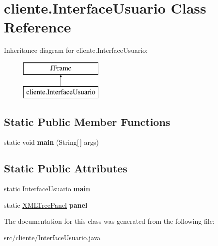 \hypertarget{classcliente_1_1_interface_usuario}{\section{cliente.\+Interface\+Usuario Class Reference}
\label{classcliente_1_1_interface_usuario}
}
Inheritance diagram for cliente.\+Interface\+Usuario\+:\begin{figure}[H]
\begin{center}
\leavevmode
\includegraphics[height=2.000000cm]{classcliente_1_1_interface_usuario}
\end{center}
\end{figure}
\subsection*{Static Public Member Functions}
\begin{DoxyCompactItemize}
\item 
\hypertarget{classcliente_1_1_interface_usuario_a0bca7dbd254234fe3e611c10620a3b3e}{static void {\bfseries main} (String\mbox{[}$\,$\mbox{]} args)}\label{classcliente_1_1_interface_usuario_a0bca7dbd254234fe3e611c10620a3b3e}

\end{DoxyCompactItemize}
\subsection*{Static Public Attributes}
\begin{DoxyCompactItemize}
\item 
\hypertarget{classcliente_1_1_interface_usuario_ab1d1c90168b592e095f5863fd06df3ba}{static \hyperlink{classcliente_1_1_interface_usuario}{Interface\+Usuario} {\bfseries main}}\label{classcliente_1_1_interface_usuario_ab1d1c90168b592e095f5863fd06df3ba}

\item 
\hypertarget{classcliente_1_1_interface_usuario_a0eafac58bc9b15d9e0ba7f5e388f92f8}{static \hyperlink{classjtree_1_1_x_m_l_tree_panel}{X\+M\+L\+Tree\+Panel} {\bfseries panel}}\label{classcliente_1_1_interface_usuario_a0eafac58bc9b15d9e0ba7f5e388f92f8}

\end{DoxyCompactItemize}


The documentation for this class was generated from the following file\+:\begin{DoxyCompactItemize}
\item 
src/cliente/Interface\+Usuario.\+java\end{DoxyCompactItemize}
